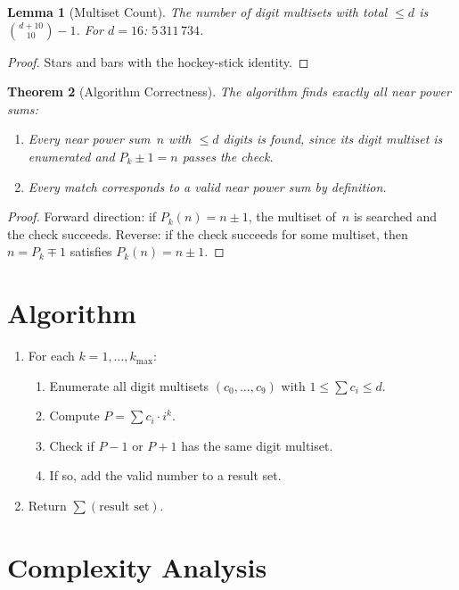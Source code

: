 \documentclass[11pt]{article}
\newtheorem{theorem}{Theorem}
\newtheorem{lemma}[theorem]{Lemma}
\theoremstyle{definition}
\begin{document}
\begin{lemma}[Multiset Count]
The number of digit multisets with total $\le d$ is $\binom{d+10}{10}-1$. For $d=16$: $5\,311\,734$.
\end{lemma}

\begin{proof}
Stars and bars with the hockey-stick identity.
\end{proof}

\begin{theorem}[Algorithm Correctness]
The algorithm finds exactly all near power sums:
\begin{enumerate}
\item Every near power sum~$n$ with $\le d$ digits is found, since its digit multiset is enumerated and $P_k \pm 1 = n$ passes the check.
\item Every match corresponds to a valid near power sum by definition.
\end{enumerate}
\end{theorem}

\begin{proof}
Forward direction: if $P_k(n) = n \pm 1$, the multiset of~$n$ is searched and the check succeeds. Reverse: if the check succeeds for some multiset, then $n = P_k \mp 1$ satisfies $P_k(n) = n \pm 1$.
\end{proof}

\section{Algorithm}

\begin{enumerate}
\item For each $k = 1,\ldots,k_{\max}$:
  \begin{enumerate}
  \item Enumerate all digit multisets $(c_0,\ldots,c_9)$ with $1 \le \sum c_i \le d$.
  \item Compute $P = \sum c_i \cdot i^k$.
  \item Check if $P-1$ or $P+1$ has the same digit multiset.
  \item If so, add the valid number to a result set.
  \end{enumerate}
\item Return $\sum(\text{result set})$.
\end{enumerate}

\section{Complexity Analysis}
\end{document}
